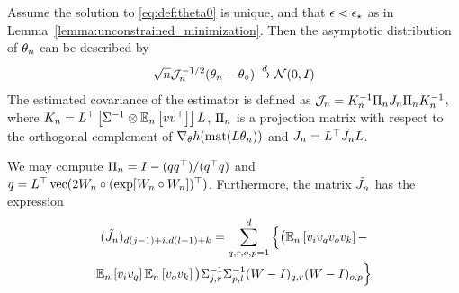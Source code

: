 \begin{lemma}
    \label{lemma:asymptotic_normal_mestparam}
    Assume the solution to \eqref{eq:def:theta0} is unique, and that $\epsilon < \epsilon_\star$ as in Lemma~\ref{lemma:unconstrained_minimization}.
    Then the asymptotic distribution of $\theta_n$ can be described by
    \begin{align}
        \label{eq:asymptotics_for_mEstParamEst}
        \sqrt{n}\mathcal J_n^{-1/2}(\theta_n - \theta_\circ) \overset{d}{\to} \mathcal N (0,I)
    \end{align}
    The estimated covariance of the estimator is defined as $\mathcal J_n = K_n^{-1}\Pi_nJ_n\Pi_nK_n^{-1}$, where
    $ K_n = L^\top   \left[ \Sigma^{-1} \otimes \mathbb{E}_n \left[  v v^\top \right] \right]L$, $\Pi_n$  is a projection matrix with respect to the orthogonal complement of $ \nabla_{\theta} h(\operatorname*{mat}(L\theta_n))$
    and  $J_n = L^\top \tilde {J_n} L $.

    We may compute $\Pi_n = I - (qq^\top)/(q^{\top}q)$ and $q = L^\top\operatorname*{vec}(2W_n \circ (\exp [ W_n\circ W_n ])^\top)$.
    Furthermore, the matrix $\tilde {J_n}$ has the expression
    \begin{multline}
        \label{eq:mest:score_variance}
        (\tilde {J_n} )_{d(j-1)+i,d(l-1)+k} =
        \sum_{q,r,o,p=1}^{d} \Big\{
        \big( \mathbb{E}_n\left[ v_i v_q v_o v_k \right]- \\
        \mathbb{E}_n\left[ v_i v_q \right]\mathbb{E}_n\left[ v_o v_k \right]\big)
        \Sigma^{-1}_{j,r}
        \Sigma^{-1}_{p,l}
        (W-I)_{q,r}
        (W-I)_{o,p}
        \Big\}
    \end{multline}
\end{lemma}
